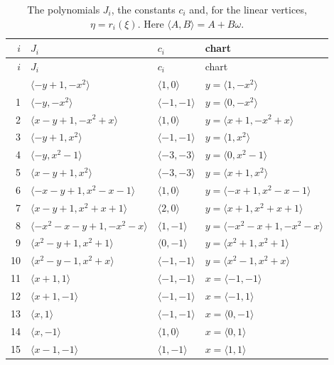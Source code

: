\documentclass[11pt]{article}
\begin{document}
\begingroup\small
\setlength{\LTcapwidth}{\textwidth}
\begin{longtable}{@{}rlll@{}}
\caption{The polynomials $J_i$, the constants $c_i$ and, for the linear vertices, $\eta=r_i(\xi)$. Here $\langle A,B\rangle=A+B\omega$.}\label{tab:cvert1}\\
\hline $i$ & $J_i$ & $c_i$ & chart\\\hline\endfirsthead\hline $i$ & $J_i$ & $c_i$ & chart\\\hline\endhead\hline\endfoot
0 & $\langle -y+1,-x^{2}\rangle$ & $\langle 1,0\rangle$ & $y=\langle 1,-x^{2}\rangle$\\
1 & $\langle -y,-x^{2}\rangle$ & $\langle -1,-1\rangle$ & $y=\langle 0,-x^{2}\rangle$\\
2 & $\langle x-y+1,-x^{2}+x\rangle$ & $\langle 1,0\rangle$ & $y=\langle x+1,-x^{2}+x\rangle$\\
3 & $\langle -y+1,x^{2}\rangle$ & $\langle -1,-1\rangle$ & $y=\langle 1,x^{2}\rangle$\\
4 & $\langle -y,x^{2}-1\rangle$ & $\langle -3,-3\rangle$ & $y=\langle 0,x^{2}-1\rangle$\\
5 & $\langle x-y+1,x^{2}\rangle$ & $\langle -3,-3\rangle$ & $y=\langle x+1,x^{2}\rangle$\\
6 & $\langle -x-y+1,x^{2}-x-1\rangle$ & $\langle 1,0\rangle$ & $y=\langle -x+1,x^{2}-x-1\rangle$\\
7 & $\langle x-y+1,x^{2}+x+1\rangle$ & $\langle 2,0\rangle$ & $y=\langle x+1,x^{2}+x+1\rangle$\\
8 & $\langle -x^{2}-x-y+1,-x^{2}-x\rangle$ & $\langle 1,-1\rangle$ & $y=\langle -x^{2}-x+1,-x^{2}-x\rangle$\\
9 & $\langle x^{2}-y+1,x^{2}+1\rangle$ & $\langle 0,-1\rangle$ & $y=\langle x^{2}+1,x^{2}+1\rangle$\\
10 & $\langle x^{2}-y-1,x^{2}+x\rangle$ & $\langle -1,-1\rangle$ & $y=\langle x^{2}-1,x^{2}+x\rangle$\\
11 & $\langle x+1,1\rangle$ & $\langle -1,-1\rangle$ & $x=\langle -1,-1\rangle$\\
12 & $\langle x+1,-1\rangle$ & $\langle -1,-1\rangle$ & $x=\langle -1,1\rangle$\\
13 & $\langle x,1\rangle$ & $\langle -1,-1\rangle$ & $x=\langle 0,-1\rangle$\\
14 & $\langle x,-1\rangle$ & $\langle 1,0\rangle$ & $x=\langle 0,1\rangle$\\
15 & $\langle x-1,-1\rangle$ & $\langle 1,-1\rangle$ & $x=\langle 1,1\rangle$\\

\end{longtable}
\end{document}

